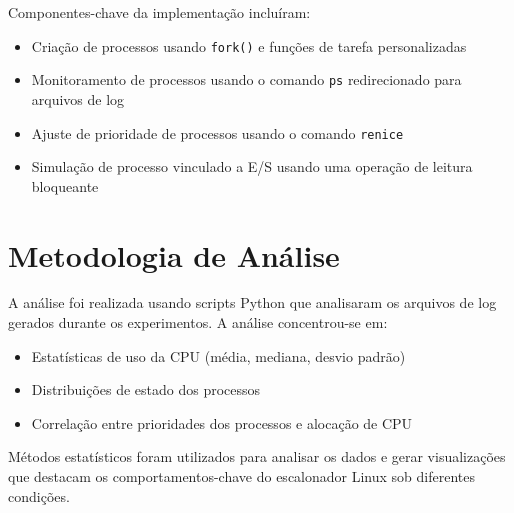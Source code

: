 \documentclass[12pt,a4paper]{article}
\begin{document}
Componentes-chave da implementação incluíram:

\begin{itemize}
    \item Criação de processos usando \texttt{fork()} e funções de tarefa personalizadas
    \item Monitoramento de processos usando o comando \texttt{ps} redirecionado para arquivos de log
    \item Ajuste de prioridade de processos usando o comando \texttt{renice}
    \item Simulação de processo vinculado a E/S usando uma operação de leitura bloqueante
\end{itemize}

\section{Metodologia de Análise}

A análise foi realizada usando scripts Python que analisaram os arquivos de log gerados durante os experimentos. A análise concentrou-se em:

\begin{itemize}
    \item Estatísticas de uso da CPU (média, mediana, desvio padrão)
    \item Distribuições de estado dos processos
    \item Correlação entre prioridades dos processos e alocação de CPU
\end{itemize}

Métodos estatísticos foram utilizados para analisar os dados e gerar visualizações que destacam os comportamentos-chave do escalonador Linux sob diferentes condições.
\end{document}
